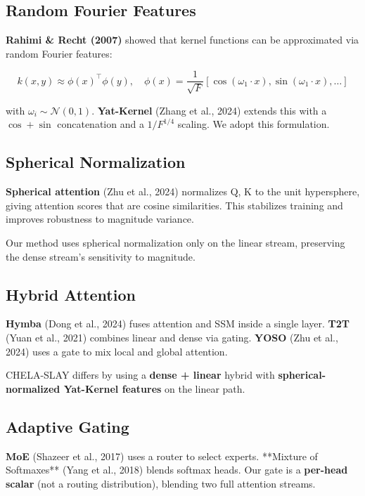 \subsection{Random Fourier Features}

\textbf{Rahimi \& Recht (2007)} showed that kernel functions can be approximated 
via random Fourier features:

\[
k(x, y) \approx \phi(x)^\top \phi(y), \quad
\phi(x) = \frac{1}{\sqrt{F}} \left[ \cos(\omega_1 \cdot x), \sin(\omega_1 \cdot x), \dots \right]
\]

with $\omega_i \sim \mathcal{N}(0, 1)$. \textbf{Yat-Kernel} (Zhang et al., 2024) 
extends this with a $\cos + \sin$ concatenation and a $1/F^{1/4}$ scaling. 
We adopt this formulation.

\subsection{Spherical Normalization}

\textbf{Spherical attention} (Zhu et al., 2024) normalizes Q, K to the unit 
hypersphere, giving attention scores that are cosine similarities. This 
stabilizes training and improves robustness to magnitude variance.

Our method uses spherical normalization only on the linear stream, 
preserving the dense stream's sensitivity to magnitude.

\subsection{Hybrid Attention}

\textbf{Hymba} (Dong et al., 2024) fuses attention and SSM inside a single 
layer. \textbf{T2T} (Yuan et al., 2021) combines linear and dense via gating. 
\textbf{YOSO} (Zhu et al., 2024) uses a gate to mix local and global attention.

CHELA-SLAY differs by using a \textbf{dense + linear} hybrid with 
\textbf{spherical-normalized Yat-Kernel features} on the linear path.

\subsection{Adaptive Gating}

\textbf{MoE} (Shazeer et al., 2017) uses a router to select experts. **Mixture 
of Softmaxes** (Yang et al., 2018) blends softmax heads. Our gate is a 
\textbf{per-head scalar} (not a routing distribution), blending two full 
attention streams.

